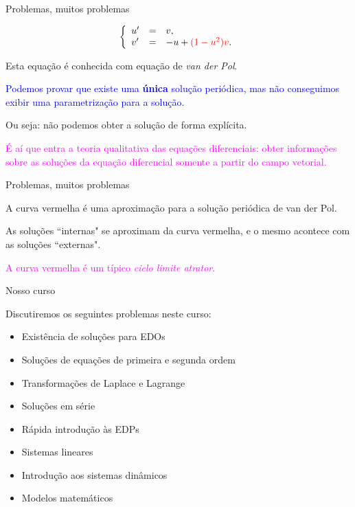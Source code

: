 \documentclass[11pt]{beamer}
\begin{document}
\begin{frame}[t]{Problemas, muitos problemas}

\[\left\{\begin{array}{lcl}
u'&=&v,\\
v'&=&-u+\textcolor{red}{(1-u^2)v}.
\end{array}
\right.
\]

Esta equação é conhecida com equação de {\it van der Pol}. \pause 

\textcolor{blue}{Podemos provar que existe uma {\bf única} solução periódica, mas não conseguimos exibir uma parametrização para a solução.}
 \pause 

Ou seja: não podemos obter a solução de forma explícita.
 \pause 

\textcolor{magenta}{É aí que entra a teoria qualitativa das equações diferenciais: obter informações sobre as soluções da equação diferencial somente a partir do campo vetorial.}

\end{frame}

\begin{frame}[t]{Problemas, muitos problemas}

\begin{minipage}[t]{0.45\textwidth}
        \vspace{0pt}
\end{minipage}%
    \hfill
    \begin{minipage}[t]{0.45\textwidth}
        \vspace{0pt}
A curva vermelha é uma aproximação para a solução periódica de van der Pol.\\ \pause 

As soluções ``internas" se aproximam da curva vermelha, e o mesmo acontece com as soluções ``externas".\\ \pause 

\textcolor{magenta}{A curva vermelha é um típico {\it ciclo limite atrator}.}
\end{minipage}
\end{frame}

\begin{frame}[t]{Nosso curso}

Discutiremos os seguintes problemas neste curso: \pause 

\begin{itemize}
\item Existência de soluções para EDOs \pause 
\item Soluções de equações de primeira e segunda ordem \pause 
\item Transformações de Laplace e Lagrange \pause 
\item Soluções em série \pause 
\item Rápida introdução às EDPs \pause 
\item Sistemas lineares \pause 
\item Introdução aos sistemas dinâmicos \pause 
\item Modelos matemáticos
\end{itemize}

\end{frame}
\end{document}
